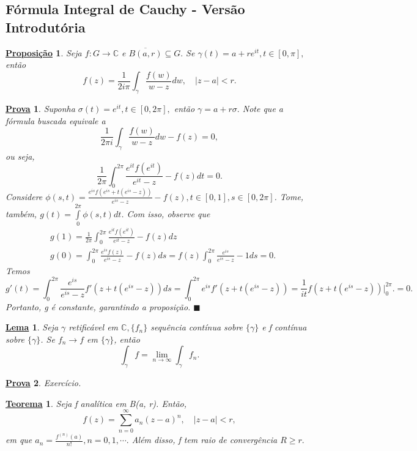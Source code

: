 \documentclass{article}
\newtheorem*{theorem*}{\underline{Teorema}}
\newtheorem*{proof*}{\underline{Prova}}
\newtheorem*{prop*}{\underline{Proposi\c c\~ao}}
\newtheorem*{lmm*}{\underline{Lema}}
\renewcommand\qedsymbol{$\blacksquare$}
\begin{document}
 \subsection{F\'ormula Integral de Cauchy - Vers\~ao Introdut\'oria}
\begin{prop*}
  Seja $f:G\rightarrow \mathbb{C}$ e $\overline{B(a, r)}\subseteq{G}.$ Se $\gamma(t) = a + r e^{it}, t\in[0, \pi],$ ent\~ao
  $$
    f(z) = \frac{1}{2i\pi}\int_{\gamma}^{}\frac{f(w)}{w-z}dw, \quad |z-a| < r.
  $$
\end{prop*}
 \begin{proof*}
   Suponha $\sigma(t) = e^{it}, t\in[0, 2\pi],$ ent\~ao $\gamma = a + r\sigma.$ Note que a f\'ormula buscada equivale a 
   $$
    \frac{1}{2\pi i}\int_{\gamma}^{}\frac{f(w)}{w-z}dw - f(z) = 0,
   $$
   ou seja,
   $$
    \frac{1}{2\pi}\int_{0}^{2\pi}\frac{e^{it}f(e^{it})}{e^{it}-z} - f(z) dt = 0.
   $$
   Considere $\phi(s, t) = \frac{e^{is}f(e^{is}+t(e^{is}-z))}{e^{is}-z} - f(z), t\in[0, 1], s\in[0, 2\pi]$. Tome, tamb\'em,
   $g(t) = \int\limits_{0}^{2\pi}\phi(s, t)dt$. Com isso, observe que 
  \begin{align*}
    &g(1) = \frac{1}{2\pi}\int_{0}^{2\pi}\frac{e^{it}f(e^{it})}{e^{it}-z} - f(z)dz \\
    &g(0) = \int_{0}^{2\pi}\frac{e^{is}f(z)}{e^{is}-z} - f(z) ds = f(z)\int_{0}^{2\pi}\frac{e^{is}}{e^{is}-z} - 1ds = 0.
  \end{align*}
  Temos 
  $$
    g'(t) = \int_{0}^{2\pi}\frac{e^{is}}{e^{is}-z}f'(z + t(e^{is}-z))ds = \int_{0}^{2\pi}e^{is}f'(z + t(e^{is}-z)) = 
    \frac{1}{it}f(z + t(e^{is}-z)) \biggl|_{0}^{2\pi}\biggr. = 0.
  $$
  Portanto, g \'e constante, garantindo a proposi\c c\~ao. \qedsymbol
 \end{proof*}
 \begin{lmm*}
   Seja $\gamma$ retific\'avel em $\mathbb{C},\{f_{n}\} $ sequ\^encia cont\'inua sobre $\{\gamma\} $ e f cont\'inua sobre
 $\{\gamma\}$. Se $f_{n}\to{f}$ em $\{\gamma\}$, ent\~ao
  $$
  \int_{\gamma}^{}f = \lim_{n\to\infty}\int_{\gamma}^{}f_{n}.
  $$
 \end{lmm*} 
\begin{proof*}
  Exerc\'icio.
\end{proof*}
\begin{theorem*}
  Seja f anal\'itica em B(a, r). Ent\~ao, 
  $$
  f(z) = \sum\limits_{n=0}^{\infty}a_{n}(z-a)^{n}, \quad |z-a| < r,
  $$
  em que $a_{n} = \frac{f^{(n)}(a)}{n!}, n = 0, 1, \cdots.$ Al\'em disso, f tem raio de converg\^encia $R\geq{r}.$
\end{theorem*}
\end{document}
